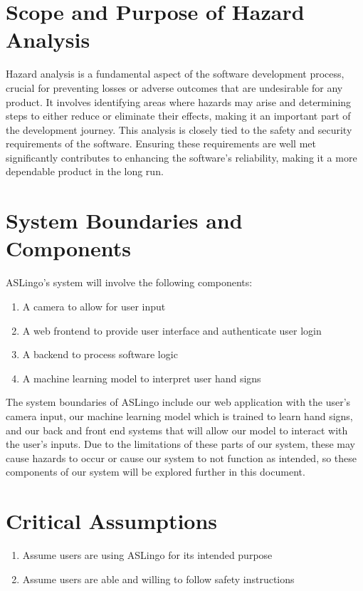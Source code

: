 \documentclass{article}
\begin{document}
\section{Scope and Purpose of Hazard Analysis}
Hazard analysis is a fundamental aspect of the software development process, crucial for preventing losses or adverse outcomes that are undesirable for any product. It involves identifying areas where hazards may arise and determining steps to either reduce or eliminate their effects, making it an important part of the development journey. This analysis is closely tied to the safety and security requirements of the software. Ensuring these requirements are well met significantly contributes to enhancing the software's reliability, making it a more dependable product in the long run.

\section{System Boundaries and Components}
ASLingo's system will involve the following components:
\begin{enumerate}
    \item A camera to allow for user input
    \item A web frontend to provide user interface and authenticate user login
    \item A backend to process software logic
    \item A machine learning model to interpret user hand signs
\end{enumerate}

The system boundaries of ASLingo include our web application with the user's camera input, our machine learning model which is trained to learn hand signs, and our back and front end systems that will allow our model to interact with the user's inputs. Due to the limitations of these parts of our system, these may cause hazards to occur or cause our system to not function as intended, so these components of our system will be explored further in this document. 

\section{Critical Assumptions}

\begin{enumerate}
    \item Assume users are using ASLingo for its intended purpose
    \item Assume users are able and willing to follow safety instructions
\end{enumerate}
\end{document}
